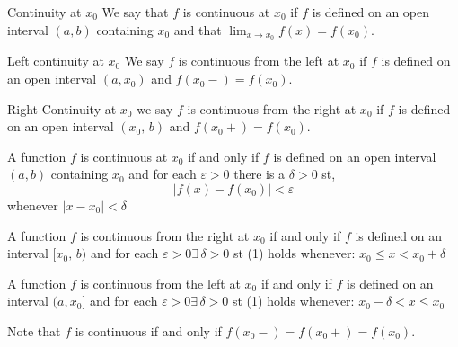 \documentclass{article}
\renewcommand{\d}{\delta}
\newcommand{\e}{\varepsilon}
\newcommand{\ex}{\exists\,}
\begin{document}
\noindent\begin{definition}{Continuity at $x_0$}{}{
 We say that $f$ is continuous at $x_0$ if $f$ is defined on an open interval $(a, b)$ containing $x_0$ and that $\lim_{x\to x_0}{f(x)} = f(x_0)$.
}\end{definition}\vspace{10pt}

\noindent\begin{definition}{Left continuity at $x_0$}{}{
  We say $f$ is continuous from the left at $x_0$ if $f$ is defined on an open interval $(a, x_0)$ and $f(x_0-) = f(x_0)$.
}\end{definition}\vspace{10pt}

\noindent\begin{definition}{Right Continuity at $x_0$}{}{
  we say $f$ is continuous from the right at $x_0$ if $f$ is defined on an open interval $(x_0,\, b)$ and $f(x_0+) = f(x_0)$.
}\end{definition}\vspace{10pt}

\begin{theorem}{}{}
  A function $f$ is continuous at $x_0$ if and only if $f$ is defined on an open interval $(a, b)$ containing $x_0$ and for each $\e>0$ there is a $\d>0$ st,
  \begin{equation}
    |f(x) - f(x_0)| < \e
  \end{equation}
  whenever $|x - x_0| < \d$
\end{theorem}

\begin{theorem}{}{}
  A function $f$ is continuous from the right at $x_0$ if and only if $f$ is defined on an interval $[x_0,\, b)$ and for each $\e > 0\ex\d > 0$ st (1) holds whenever: $\displaystyle{x_0 \le x < x_0 + \d}$
\end{theorem}

\begin{theorem}{}{}
  A function $f$ is continuous from the left at $x_0$ if and only if $f$ is defined on an interval $(a, x_0]$ and for each $\e > 0\ex\d > 0$ st (1) holds whenever: $\displaystyle{x_0 - \d < x \le x_0}$
\end{theorem}

Note that $f$ is continuous if and only if $f(x_0-) = f(x_0+) = f(x_0)$.\\
\end{document}
